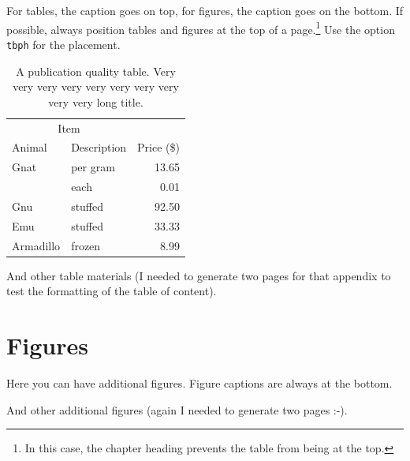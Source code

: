 \documentclass[msc,oneside]{ubcthesis}%
\begin{document}
For tables, the caption goes on top, for figures, the caption goes on the bottom. If possible, always position tables and figures at the top of a page.\footnote{In this case, the chapter heading prevents the table from being at the top.} Use the option \verb|tbph| for the placement.

\begin{table}[tbph]
\centering
\caption{A publication quality table. Very very very very very very very very very very long title.
\label{table:food}}
\begin{tabular}{@{}llr@{}} \toprule 
\multicolumn{2}{c}{Item} \\ \cmidrule(r){1-2} 
Animal & Description & Price (\$)\\ \midrule 
Gnat & per gram & 13.65 \\ 
& each & 0.01 \\ 
Gnu & stuffed & 92.50 \\ 
Emu & stuffed & 33.33 \\ 
Armadillo & frozen & 8.99 \\ \bottomrule 
\end{tabular}
\end{table}


\newpage

And other table materials (I needed to generate two pages for that appendix to test the formatting of the table of content).

\chapter{Figures}
Here you can have additional figures. Figure captions are always at the bottom.

\newpage

And other additional figures (again I needed to generate two pages :-).
\end{document}
